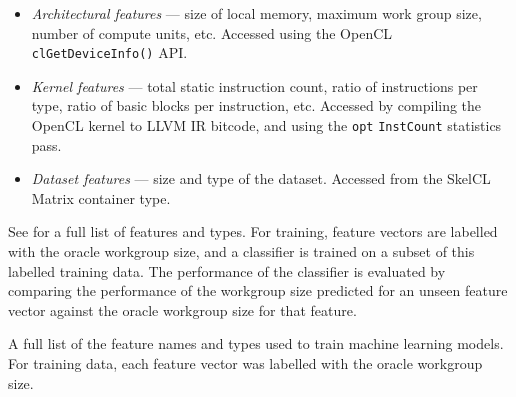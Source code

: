 \begin{itemize}
\item \emph{Architectural features} --- size of local memory, maximum
  work group size, number of compute units, etc. Accessed using the
  OpenCL \texttt{clGetDeviceInfo()} API.
\item \emph{Kernel features} --- total static instruction count, ratio
  of instructions per type, ratio of basic blocks per instruction,
  etc. Accessed by compiling the OpenCL kernel to LLVM IR bitcode, and
  using the \texttt{opt} \texttt{InstCount} statistics pass.
\item \emph{Dataset features} --- size and type of the
  dataset. Accessed from the SkelCL Matrix container type.
\end{itemize}

See  for a full list of features and types. For
training, feature vectors are labelled with the oracle workgroup size,
and a classifier is trained on a subset of this labelled training
data. The performance of the classifier is evaluated by comparing the
performance of the workgroup size predicted for an unseen feature
vector against the oracle workgroup size for that feature.

A full list of the feature names and types used to train machine
learning models. For training data, each feature vector was labelled
with the oracle workgroup size.

